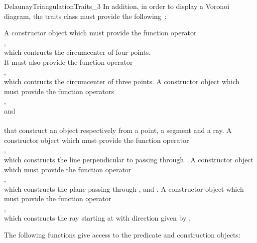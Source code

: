 \begin{ccRefConcept}{DelaunayTriangulationTraits_3}
In addition, in order to display a Voronoi diagram, the traits class
must provide the following~:

{A constructor object which must provide the function operator\\
,\\
which contructs the circumcenter of four points.
\\
It must also provide the function operator\\
,\\
which contructs the circumcenter of three points.
}
\ccGlue
{}
{A constructor object which must provide the function operators\\
,\\
 and\\
\\
that construct an object respectively from a point, a segment and a ray.}
\ccGlue
{}
{A constructor object which must provide the function operator\\
,\\
which constructs the line perpendicular to  passing through .}
\ccGlue
{}
{A constructor object which must provide the function operator\\
,\\
which constructs the plane passing through ,  and .
}
\ccGlue
{}
{A constructor object which must provide the function operator\\
,\\
which constructs the ray starting at  with direction given by .}


\ccOperations

The following functions give access to the predicate and construction objects:



\end{ccRefConcept}
